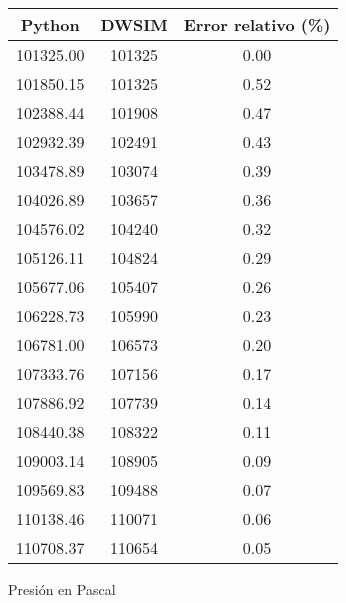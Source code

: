 \begin{figure}[H]
    \centering
    \caption{Presión en Pascal}
    \small
    \begin{tabular}{|c|c|c|}
        \hline
        \textbf{Python} & \textbf{DWSIM} & \textbf{Error relativo (\%)} \\
        \hline
        101325.00       & 101325         & 0.00                         \\
        \hline
        101850.15       & 101325         & 0.52                         \\
        \hline
        102388.44       & 101908         & 0.47                         \\
        \hline
        102932.39       & 102491         & 0.43                         \\
        \hline
        103478.89       & 103074         & 0.39                         \\
        \hline
        104026.89       & 103657         & 0.36                         \\
        \hline
        104576.02       & 104240         & 0.32                         \\
        \hline
        105126.11       & 104824         & 0.29                         \\
        \hline
        105677.06       & 105407         & 0.26                         \\
        \hline
        106228.73       & 105990         & 0.23                         \\
        \hline
        106781.00       & 106573         & 0.20                         \\
        \hline
        107333.76       & 107156         & 0.17                         \\
        \hline
        107886.92       & 107739         & 0.14                         \\
        \hline
        108440.38       & 108322         & 0.11                         \\
        \hline
        109003.14       & 108905         & 0.09                         \\
        \hline
        109569.83       & 109488         & 0.07                         \\
        \hline
        110138.46       & 110071         & 0.06                         \\
        \hline
        110708.37       & 110654         & 0.05                         \\

\end{tabular}
\end{figure}
